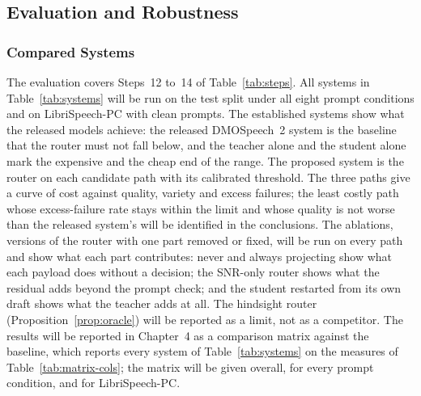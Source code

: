 \subsection{Evaluation and Robustness}
\label{sec:obj4}
\label{sec:analysis}

\subsubsection{Compared Systems}
\label{sec:compared}

The evaluation covers Steps~12 to~14 of Table~\ref{tab:steps}. All systems in Table~\ref{tab:systems} will be run on the test split under all eight prompt conditions and on LibriSpeech-PC with clean prompts. The established systems show what the released models achieve: the released DMOSpeech~2 system is the baseline that the router must not fall below, and the teacher alone and the student alone mark the expensive and the cheap end of the range. The proposed system is the router on each candidate path with its calibrated threshold. The three paths give a curve of cost against quality, variety and excess failures; the least costly path whose excess-failure rate stays within the limit and whose quality is not worse than the released system's will be identified in the conclusions. The ablations, versions of the router with one part removed or fixed, will be run on every path and show what each part contributes: never and always projecting show what each payload does without a decision; the SNR-only router shows what the residual adds beyond the prompt check; and the student restarted from its own draft shows what the teacher adds at all. The hindsight router (Proposition~\ref{prop:oracle}) will be reported as a limit, not as a competitor. The results will be reported in Chapter~4 as a comparison matrix against the baseline, which reports every system of Table~\ref{tab:systems} on the measures of Table~\ref{tab:matrix-cols}; the matrix will be given overall, for every prompt condition, and for LibriSpeech-PC.

